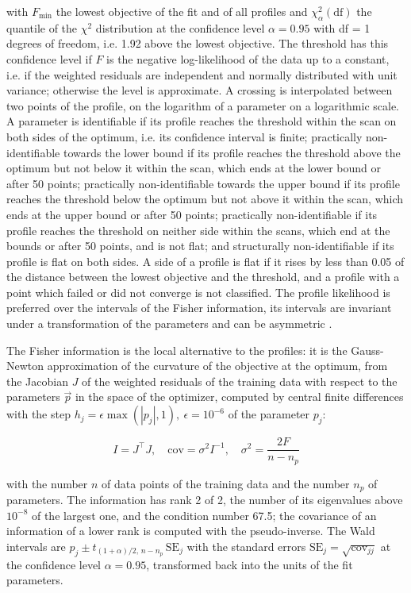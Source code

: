 \documentclass{article}
\begin{document}
with $F_{\min}$ the lowest objective of the fit and of all profiles and $\chi^2_{\alpha}(\mathrm{df})$ the quantile of the $\chi^2$ distribution at the confidence level $\alpha = 0.95$ with df = 1 degrees of freedom, i.e. 1.92 above the lowest objective. The threshold has this confidence level if $F$ is the negative log-likelihood of the data up to a constant, i.e. if the weighted residuals are independent and normally distributed with unit variance; otherwise the level is approximate. A crossing is interpolated between two points of the profile, on the logarithm of a parameter on a logarithmic scale. A parameter is identifiable if its profile reaches the threshold within the scan on both sides of the optimum, i.e. its confidence interval is finite; practically non-identifiable towards the lower bound if its profile reaches the threshold above the optimum but not below it within the scan, which ends at the lower bound or after 50 points; practically non-identifiable towards the upper bound if its profile reaches the threshold below the optimum but not above it within the scan, which ends at the upper bound or after 50 points; practically non-identifiable if its profile reaches the threshold on neither side within the scans, which end at the bounds or after 50 points, and is not flat; and structurally non-identifiable if its profile is flat on both sides. A side of a profile is flat if it rises by less than 0.05 of the distance between the lowest objective and the threshold, and a profile with a point which failed or did not converge is not classified. The profile likelihood is preferred over the intervals of the Fisher information, its intervals are invariant under a transformation of the parameters and can be asymmetric \cite{Wieland2021}.

The Fisher information is the local alternative to the profiles: it is the Gauss-Newton approximation of the curvature of the objective at the optimum, from the Jacobian $J$ of the weighted residuals of the training data with respect to the parameters $\vec{p}$ in the space of the optimizer, computed by central finite differences with the step $h_j = \epsilon \max(|p_j|, 1),\ \epsilon = 10^{-6}$ of the parameter $p_j$:

\begin{equation}
I = J^\top J, \quad \mathrm{cov} = \sigma^2 I^{-1}, \quad \sigma^2 = \frac{2 F}{n - n_p}
\end{equation}

with the number $n$ of data points of the training data and the number $n_p$ of parameters. The information has rank 2 of 2, the number of its eigenvalues above $10^{-8}$ of the largest one, and the condition number 67.5; the covariance of an information of a lower rank is computed with the pseudo-inverse. The Wald intervals are $\hat{p}_j \pm t_{(1+\alpha)/2,\, n-n_p}\, \mathrm{SE}_j$ with the standard errors $\mathrm{SE}_j = \sqrt{\mathrm{cov}_{jj}}$ at the confidence level $\alpha = 0.95$, transformed back into the units of the fit parameters.
\end{document}
